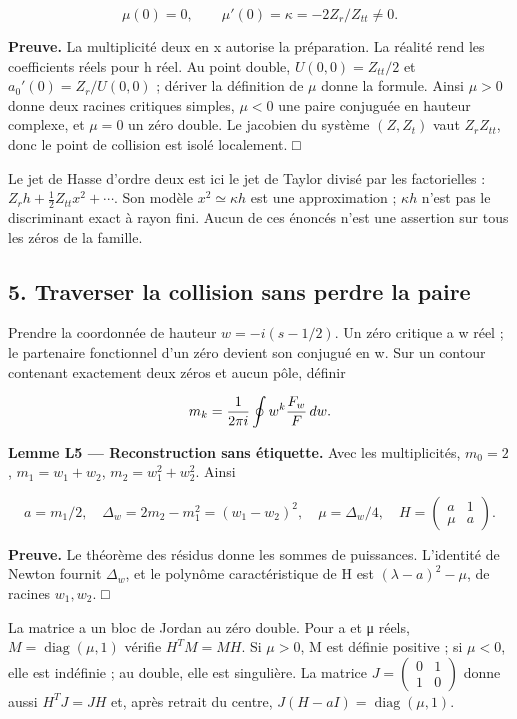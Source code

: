 \documentclass[
  10pt,
  a4paper,
]{article}
\begin{document}
\[
\mu(0)=0,\qquad \mu'(0)=\kappa=-2Z_r/Z_{tt}\ne0.
\]

\textbf{Preuve.} La multiplicité deux en x autorise la préparation. La
réalité rend les coefficients réels pour h réel. Au point double,
\(U(0,0)=Z_{tt}/2\) et \(a_0'(0)=Z_r/U(0,0)\) ; dériver la définition de
\(\mu\) donne la formule. Ainsi \(\mu>0\) donne deux racines critiques
simples, \(\mu<0\) une paire conjuguée en hauteur complexe, et \(\mu=0\)
un zéro double. Le jacobien du système \((Z,Z_t)\) vaut \(Z_rZ_{tt}\),
donc le point de collision est isolé localement. □

Le jet de Hasse d'ordre deux est ici le jet de Taylor divisé par les
factorielles : \(Z_rh+\tfrac12Z_{tt}x^2+\cdots\). Son modèle
\(x^2\simeq\kappa h\) est une approximation ; \(\kappa h\) n'est pas le
discriminant exact à rayon fini. Aucun de ces énoncés n'est une
assertion sur tous les zéros de la famille.

\newpage

\hypertarget{traverser-la-collision-sans-perdre-la-paire}{%
\subsection{5. Traverser la collision sans perdre la
paire}\label{traverser-la-collision-sans-perdre-la-paire}}

Prendre la coordonnée de hauteur \(w=-i(s-1/2)\). Un zéro critique a w
réel ; le partenaire fonctionnel d'un zéro devient son conjugué en w.
Sur un contour contenant exactement deux zéros et aucun pôle, définir

\[
m_k={1\over2\pi i}\oint w^k{F_w\over F}\,dw.
\]

\textbf{Lemme L5 --- Reconstruction sans étiquette.} Avec les
multiplicités, \(m_0=2\), \(m_1=w_1+w_2\), \(m_2=w_1^2+w_2^2\). Ainsi

\[
a=m_1/2,\quad\Delta_w=2m_2-m_1^2=(w_1-w_2)^2,
\quad\mu=\Delta_w/4,
\quad H=\begin{pmatrix}a&1\\\mu&a\end{pmatrix}.
\]

\textbf{Preuve.} Le théorème des résidus donne les sommes de puissances.
L'identité de Newton fournit \(\Delta_w\), et le polynôme
caractéristique de H est \((\lambda-a)^2-\mu\), de racines \(w_1,w_2\).
□

La matrice a un bloc de Jordan au zéro double. Pour a et μ réels,
\(M=\operatorname{diag}(\mu,1)\) vérifie \(H^TM=MH\). Si \(\mu>0\), M
est définie positive ; si \(\mu<0\), elle est indéfinie ; au double,
elle est singulière. La matrice
\(J=\begin{pmatrix}0&1\\1&0\end{pmatrix}\) donne aussi \(H^TJ=JH\) et,
après retrait du centre, \(J(H-aI)=\operatorname{diag}(\mu,1)\).
\end{document}
